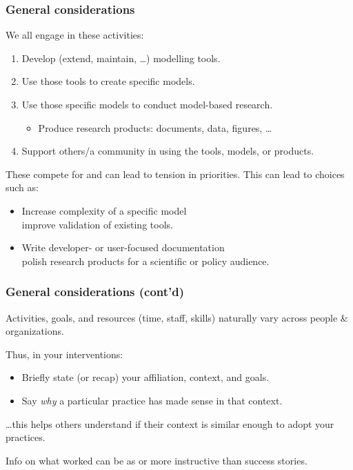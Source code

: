 \documentclass[12pt,aspectratio=169]{beamer}
\begin{document}
\begin{frame}
\frametitle{General considerations}

We all engage in these activities:
\begin{enumerate}
  \item Develop (extend, maintain, …) modelling tools.
  \item Use those tools to create specific models.
  \item Use those specific models to conduct model-based research.
    \begin{itemize}
      \item Produce research products: documents, data, figures, …
    \end{itemize}
  \item Support others/a community in using the tools, models, or products.
\end{enumerate}

\medskip
These compete for  and can lead to tension in priorities.
This can lead to choices such as:
\begin{itemize}
  \item Increase complexity of a specific model \\
     improve validation of existing tools.
  \item Write developer- or user-focused documentation \\
     polish research products for a scientific or policy audience.
\end{itemize}

\end{frame}

\begin{frame}
\frametitle{General considerations (cont'd)}

Activities, goals, and resources (time, staff, skills) naturally vary across people \& organizations.

\bigskip
Thus, in your interventions:
\begin{itemize}
  \item Briefly state (or recap) your affiliation, context, and goals.
  \item Say \emph{why} a particular practice has made sense in that context.
\end{itemize}
…this helps others understand if their context is similar enough to adopt your practices.

\bigskip
Info on what  worked can be as or more instructive than success stories.

\end{frame}
\end{document}
